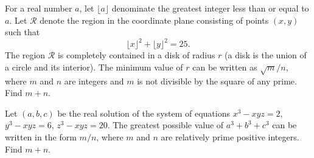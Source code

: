 \documentclass[11pt]{article}
\theoremstyle{definition}
\begin{document}
%	












\begin{question}[name={2010 AIME I, \href{https://artofproblemsolving.com/community/c4p1813807}{Problem 8}}]
	For a real number $ a$, let $ \lfloor a \rfloor$ denominate the greatest integer less than or equal to $ a$. Let $ \mathcal{R}$ denote the region in the coordinate plane consisting of points $ (x,y)$ such that\[\lfloor x \rfloor ^2 + \lfloor y \rfloor ^2 = 25.\]The region $ \mathcal{R}$ is completely contained in a disk of radius $ r$ (a disk is the union of a circle and its interior). The minimum value of $ r$ can be written as $  {\sqrt {m}}/{n}$, where $ m$ and $ n$ are integers and $ m$ is not divisible by the square of any prime. Find $m + n$.
\end{question}


%	


























\begin{question}[name={2010 AIME I, \href{https://artofproblemsolving.com/community/c4p1813805}{Problem 9}}]
	Let $ (a,b,c)$ be the real solution of the system of equations $ x^3 - xyz = 2$, $ y^3 - xyz = 6$, $ z^3 - xyz = 20$. The greatest possible value of $ a^3 + b^3 + c^3$ can be written in the form ${m}/{n}$, where $ m$ and $ n$ are relatively prime positive integers. Find $ m + n$.
\end{question}


%	
\end{document}
